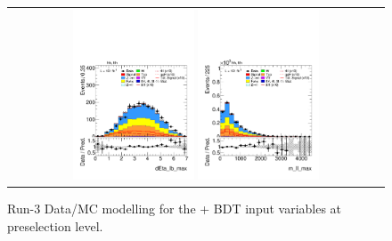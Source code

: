 \begin{figure}[htbp]
\begin{tabular}{@{}c c c@{}}
    \\[4pt]
    \multicolumn{3}{c}{%
      \includegraphics[width=0.33\textwidth]{images/plots_modelling_run2_run3_variables/run_3_tth/plot_dEta_lb_max_hh_tth_22_23_24.pdf}%
      \hspace{1.5pt}%
      \includegraphics[width=0.33\textwidth]{images/plots_modelling_run2_run3_variables/run_3_tth/plot_m_ll_max_hh_tth_22_23_24.pdf}%
    }\\
  \end{tabular}

  \caption{Run-3 Data/MC modelling for the \thqb + \ttH BDT input variables at preselection level.}
  \label{tth_vars_modelling_run3_2}
\end{figure}




